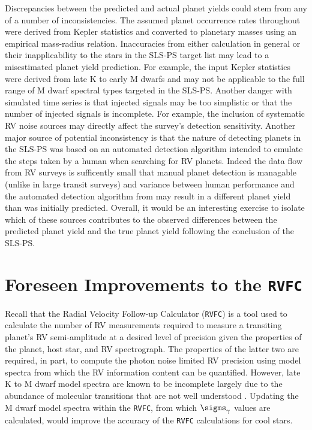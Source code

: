 Discrepancies between the predicted and actual planet yields could stem
from any of a number of inconsistencies. The assumed planet occurrence rates
throughout were derived from Kepler statistics and converted to planetary masses
using an empirical mass-radius relation. Inaccuracies from either calculation
in general or their inapplicability to the stars in the SLS-PS target list may
lead to a misestimated planet yield prediction. For example, the input Kepler
statistics were derived from late K to early M dwarfs \citep{dressing15a} and
may not be applicable to the full range of M dwarf spectral types targeted in
the SLS-PS. Another danger with simulated time series is that injected signals
may be too simplistic or that the number of injected signals is incomplete. For
example, the inclusion of systematic RV noise sources may directly affect the
survey's detection sensitivity. Another major source of potential inconsistency
is that the nature of detecting planets in the SLS-PS was based on an automated
detection algorithm intended to emulate the steps taken by a human when
searching for RV planets. Indeed the data flow from RV surveys is sufficently
small that manual planet detection is managable (unlike in large transit
surveys) and variance between human performance and the automated detection
algorithm from \cite{cloutier18a} may result in a different planet yield than
was initially predicted. Overall, it would be an interesting exercise to
isolate which of these sources contributes to the observed differences between
the predicted planet yield and the true planet yield following the conclusion
of the SLS-PS.

\section{Foreseen Improvements to the \texttt{RVFC}}
Recall that the Radial Velocity Follow-up Calculator (\texttt{RVFC}) is a tool
used to calculate the number of RV measurements required to measure a transiting
planet's RV semi-amplitude at a desired level of precision given the properties
of the planet, host star, and RV spectrograph. The properties of the latter two
are required, in part, to compute the photon noise limited RV precision using
model spectra from which the RV information content can be quantified. However,
late K to M dwarf model spectra are known to be incomplete largely due to the
abundance of molecular transitions that are not well understood
\citep{passegger16,behmard19}. Updating the M dwarf model spectra within the
\texttt{RVFC}, from which $\sigms_{\gamma}$ values are calculated, would improve
the accuracy of the \texttt{RVFC} calculations for cool stars. \\

